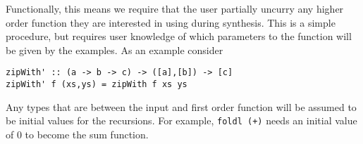 Functionally, this means we require that the user partially uncurry any higher order function they are interested in using during synthesis. This is a simple procedure, but requires user knowledge of which parameters to the function will be given by the examples. As an example consider 

\begin{lstlisting}
zipWith' :: (a -> b -> c) -> ([a],[b]) -> [c]
zipWith' f (xs,ys) = zipWith f xs ys
\end{lstlisting}

Any types that are between the input and first order function will be assumed to be initial values for the recursions. For example, \texttt{foldl (+)} needs an initial value of 0 to become the sum function.

